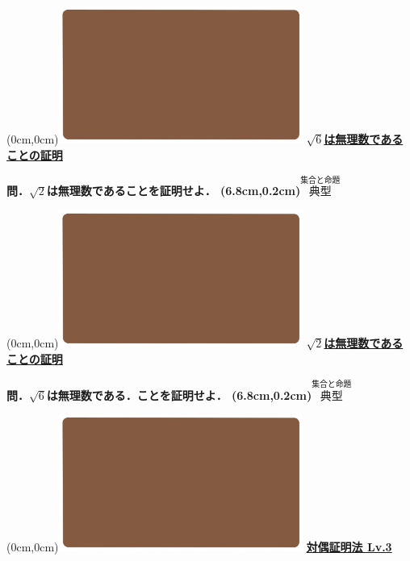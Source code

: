 \documentclass[10pt,
fleqn,
dvipdfmx,
uplatex
]{jsarticle}
\begin{document}
\at(0cm,0cm){\includegraphics[width=8cm,bb=0 0 1920 1080]{./youtube/thumbnails/templates/smart_background/集合と命題.jpeg}}
{\color{orange}\bf\boldmath\Large\underline{$\sqrt 6$は無理数であることの証明}}\vspace{0.3zw}

\huge 
\bf\boldmath 問．$\sqrt 2$は無理数であることを証明せよ．
\at(6.8cm,0.2cm){\small\color{bradorange}$\overset{\text{集合と命題}}{\text{典型}}$}


\newpage



\at(0cm,0cm){\includegraphics[width=8cm,bb=0 0 1920 1080]{./youtube/thumbnails/templates/smart_background/集合と命題.jpeg}}
{\color{orange}\bf\boldmath\Large\underline{$\sqrt 2$は無理数であることの証明}}\vspace{0.3zw}

\huge 
\bf\boldmath 問．$\sqrt 6$は無理数である．ことを証明せよ．
\at(6.8cm,0.2cm){\small\color{bradorange}$\overset{\text{集合と命題}}{\text{典型}}$}


\newpage



\at(0cm,0cm){\includegraphics[width=8cm,bb=0 0 1920 1080]{./youtube/thumbnails/templates/smart_background/集合と命題.jpeg}}
{\color{orange}\bf\boldmath\huge\underline{対偶証明法 Lv.3 }}\vspace{0.3zw}
\end{document}
